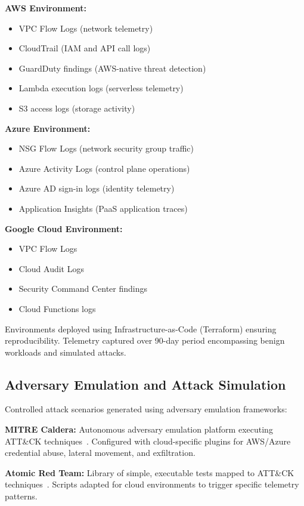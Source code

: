 \textbf{AWS Environment:}
\begin{itemize}
    \item VPC Flow Logs (network telemetry)
    \item CloudTrail (IAM and API call logs)
    \item GuardDuty findings (AWS-native threat detection)
    \item Lambda execution logs (serverless telemetry)
    \item S3 access logs (storage activity)
\end{itemize}

\textbf{Azure Environment:}
\begin{itemize}
    \item NSG Flow Logs (network security group traffic)
    \item Azure Activity Logs (control plane operations)
    \item Azure AD sign-in logs (identity telemetry)
    \item Application Insights (PaaS application traces)
\end{itemize}

\textbf{Google Cloud Environment:}
\begin{itemize}
    \item VPC Flow Logs
    \item Cloud Audit Logs
    \item Security Command Center findings
    \item Cloud Functions logs
\end{itemize}

Environments deployed using Infrastructure-as-Code (Terraform) ensuring reproducibility. Telemetry captured over 90-day period encompassing benign workloads and simulated attacks.

\subsection{Adversary Emulation and Attack Simulation}
Controlled attack scenarios generated using adversary emulation frameworks:

\textbf{MITRE Caldera:} Autonomous adversary emulation platform executing ATT\&CK techniques~\cite{mitrecaldera2023}. Configured with cloud-specific plugins for AWS/Azure credential abuse, lateral movement, and exfiltration.

\textbf{Atomic Red Team:} Library of simple, executable tests mapped to ATT\&CK techniques~\cite{atomicredteam2023}. Scripts adapted for cloud environments to trigger specific telemetry patterns.

